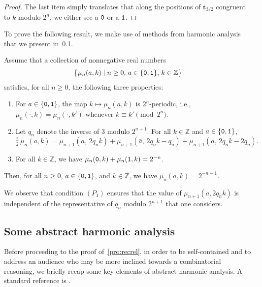 \documentclass[12pt,reqno]{article}
\newcommand{\cA}{\{{\tt 0},{\tt 1}\}}
\newcommand{\Z}{\mathbb{Z}}
\begin{document}
\begin{proof}
    The last item simply translates that along the positions of $\mathbf{t}_{3/2}$ congruent to $k$ modulo $2^n$, we either see a ${\tt 0}$ or a ${\tt 1}$.
\end{proof}

To prove the following result,  we make use of methods from harmonic analysis that we present in~\cref{sec: abstract harmonic analysis}.

\begin{proposition}\label{pro:recrel}
  Assume that a collection of nonnegative real numbers
  \[
    \bigl\{\mu_n(a,k) \mid n \ge 0,\, a \in \cA,\, k \in \Z\bigr\}
  \] satisfies, for all $n \ge 0$,  the following three properties: 
\begin{enumerate}[label=$(P_{\arabic*})$]
    \item For $a \in \cA$, the map $k \mapsto \mu_n(a,k)$ is $2^n$-periodic, i.e.,
    $\mu_n(\cdot,k) = \mu_n(\cdot,k')$ whenever $k \equiv k' \pmod{2^n}$.

    \item Let $q_n$ denote the inverse of $3$ modulo $2^{n+1}$. For all $k \in \Z$ and $a \in \cA$,
    \[  
    \tfrac{3}{2} \, \mu_n(a,k) = \mu_{n+1}(a,\,2q_n k) + \mu_{n+1}(\bar a,\,2q_n k - q_n) + \mu_{n+1}(a,\,2q_n k - 2q_n).
    \]

    \item For all $k \in \Z$,  we have $\mu_n({\tt 0},k)+\mu_n({\tt 1},k) = 2^{-n}$.
\end{enumerate}
Then, for all $n \ge 0$,  $a \in \cA$,  and $k \in \Z$,  we have $ \mu_n(a,k) = 2^{-n-1}$.
\end{proposition}

\begin{remark}
  We observe that condition $(P_1)$ ensures that the value of
  $\mu_{n+1}(a,2q_n k)$ is independent of the representative of $q_n$
  modulo $2^{n+1}$ that one considers.
\end{remark}

\subsection{Some abstract harmonic analysis}
\label{sec: abstract harmonic analysis}

Before proceeding to the proof of~\cref{pro:recrel}, in order to be self-contained and to address an audience who may be more inclined towards a combinatorial reasoning, we briefly recap some key elements of abstract harmonic analysis. A standard reference is \cite{AHA}.
\end{document}
